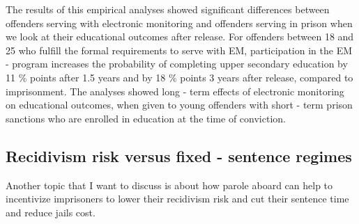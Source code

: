\documentclass[a4paper,12pt]{article}
\begin{document}
The results of this empirical analyses showed significant differences between offenders serving with electronic monitoring and offenders serving in prison when we look at their educational outcomes after release. For offenders between 18 and 25 who fulfill the formal requirements to serve with EM, participation in the EM - program increases the probability  of completing upper secondary education by 11 \% points after 1.5 years and by 18 \% points 3 years after release, compared to imprisonment. The analyses showed long - term effects of electronic monitoring on educational outcomes, when given to young offenders with short - term prison sanctions who are enrolled in education at the time of conviction. 




\subsection{Recidivism risk versus fixed - sentence regimes}
Another topic that I want to discuss is about how parole aboard can help to incentivize imprisoners to lower their recidivism risk and cut their sentence time and reduce jails cost. 
\end{document}
